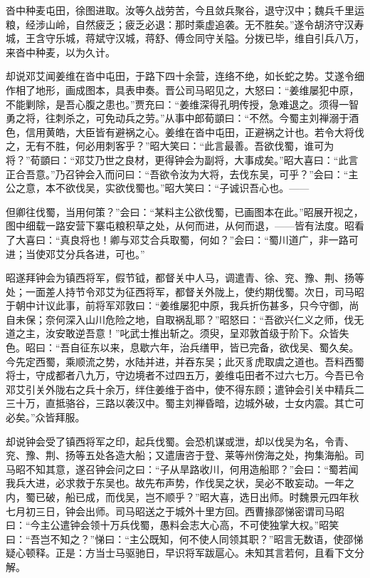 沓中种麦屯田，徐图进取。汝等久战劳苦，今且敛兵聚谷，退守汉中；魏兵千里运粮，经涉山岭，自然疲乏；疲乏必退：那时乘虚追袭。无不胜矣。”遂令胡济守汉寿城，王含守乐城，蒋斌守汉城，蒋舒、傅佥同守关隘。分拨已毕，维自引兵八万，来沓中种麦，以为久计。

却说邓艾闻姜维在沓中屯田，于路下四十余营，连络不绝，如长蛇之势。艾遂令细作相了地形，画成图本，具表申奏。晋公司马昭见之，大怒曰：“姜维屡犯中原，不能剿除，是吾心腹之患也。”贾充曰：“姜维深得孔明传授，急难退之。须得一智勇之将，往刺杀之，可免动兵之劳。”从事中郎荀顗曰：“不然。今蜀主刘禅溺于酒色，信用黄皓，大臣皆有避祸之心。姜维在沓中屯田，正避祸之计也。若令大将伐之，无有不胜，何必用刺客乎？”昭大笑曰：“此言最善。吾欲伐蜀，谁可为将？”荀顗曰：“邓艾乃世之良材，更得钟会为副将，大事成矣。”昭大喜曰：“此言正合吾意。”乃召钟会入而问曰：“吾欲令汝为大将，去伐东吴，可乎？”会曰：“主公之意，本不欲伐吴，实欲伐蜀也。”昭大笑曰：“子诚识吾心也。——

但卿往伐蜀，当用何策？”会曰：“某料主公欲伐蜀，已画图本在此。”昭展开视之，图中细载一路安营下寨屯粮积草之处，从何而进，从何而退，——皆有法度。昭看了大喜曰：“真良将也！卿与邓艾合兵取蜀，何如？”会曰：“蜀川道广，非一路可进；当使邓艾分兵各进，可也。”

昭遂拜钟会为镇西将军，假节钺，都督关中人马，调遣青、徐、兖、豫、荆、扬等处；一面差人持节令邓艾为征西将军，都督关外陇上，使约期伐蜀。次日，司马昭于朝中计议此事，前将军邓敦曰：“姜维屡犯中原，我兵折伤甚多，只今守御，尚自未保；奈何深入山川危险之地，自取祸乱耶？”昭怒曰：“吾欲兴仁义之师，伐无道之主，汝安敢逆吾意！”叱武士推出斩之。须臾，呈邓敦首级于阶下。众皆失色。昭曰：“吾自征东以来，息歇六年，治兵缮甲，皆已完备，欲伐吴、蜀久矣。今先定西蜀，乘顺流之势，水陆并进，并吞东吴；此灭豸虎取虞之道也。吾料西蜀将士，守成都者八九万，守边境者不过四五万，姜维屯田者不过六七万。今吾已令邓艾引关外陇右之兵十余万，绊住姜维于沓中，使不得东顾；遣钟会引关中精兵二三十万，直抵骆谷，三路以袭汉中。蜀主刘禅昏暗，边城外破，士女内震。其亡可必矣。”众皆拜服。

却说钟会受了镇西将军之印，起兵伐蜀。会恐机谋或泄，却以伐吴为名，令青、兖、豫、荆、扬等五处各造大船；又遣唐咨于登、莱等州傍海之处，拘集海船。司马昭不知其意，遂召钟会问之曰：“子从旱路收川，何用造船耶？”会曰：“蜀若闻我兵大进，必求救于东吴也。故先布声势，作伐吴之状，吴必不敢妄动。一年之内，蜀已破，船已成，而伐吴，岂不顺乎？”昭大喜，选日出师。时魏景元四年秋七月初三日，钟会出师。司马昭送之于城外十里方回。西曹掾邵悌密谓司马昭曰：“今主公遣钟会领十万兵伐蜀，愚料会志大心高，不可使独掌大权。”昭笑曰：“吾岂不知之？”悌曰：“主公既知，何不使人同领其职？”昭言无数语，使邵悌疑心顿释。正是：方当士马驱驰日，早识将军跋扈心。未知其言若何，且看下文分解。